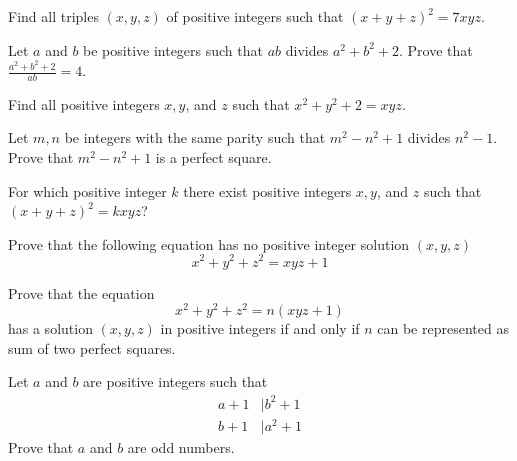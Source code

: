 \documentclass{subfile}
\begin{document}
	\begin{problem} %
		Find all triples $(x,y,z)$ of positive integers such that $(x+y+z)^2=7xyz$.
	\end{problem}

	\begin{problem} %
		 Let $a$ and $b$ be positive integers such that $ab$ divides $a^2 + b^2 + 2$. Prove that $\frac{a^2 + b^2 + 2}{ab} = 4$.
	\end{problem}

	\begin{problem} %
		Find all positive integers $x,y$, and $z$ such that $x^2+y^2+2=xyz$.
	\end{problem}

	\begin{problem}[Ireland 2005] %
		Let $m,n$ be integers with the same parity such that $m^2-n^2+1$ divides $n^2-1$. Prove that $m^2-n^2+1$ is a perfect square.
	\end{problem}

	\begin{problem}[Mongolia 2000] %
		For which positive integer $k$ there exist positive integers $x,y$, and $z$ such that $(x+y+z)^2= kxyz$?
	\end{problem}

	\begin{problem} %
		Prove that the following equation has no positive integer solution $(x,y,z)$ \[x^2+y^2+z^2=xyz+1\]
	\end{problem}

	\begin{problem} %
		Prove that the equation \[x^2+y^2+z^2=n(xyz+1)\] has a solution $(x,y,z)$ in positive integers if and only if $n$ can be represented as sum of two perfect squares.
	\end{problem}

	\begin{problem} %
		Let $a$ and $b$ are positive integers such that
			\begin{align*}
				a + 1
					& \mid {b^2} + 1\\
				b + 1
					& \mid{a^2} + 1
			\end{align*}
		Prove that $a$ and $b$ are odd numbers.
	\end{problem}
\end{document}
